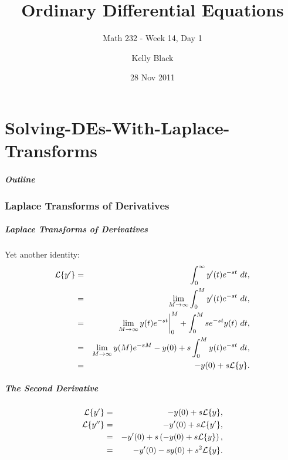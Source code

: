 

\part{Solving-DEs-With-Laplace-Transforms}

\title{Ordinary Differential Equations}
\subtitle{Math 232 - Week 14, Day 1}

\author{Kelly Black}
\date{28 Nov 2011}

\begin{frame}
  \titlepage
\end{frame}

\begin{frame}
  \frametitle{Outline}
\end{frame}


\section{Laplace Transforms of Derivatives}


\begin{frame}
  \frametitle{Laplace Transforms of Derivatives}

  Yet another identity:
  \begin{eqnarray*}
    \laplace{y'} & = & \int^\infty_0 y'(t) e^{-st} ~ dt, \\
    & = & \lim_{M\rightarrow\infty} \int^M_0 y'(t) e^{-st} ~ dt, \\
    & = & \lim_{M\rightarrow\infty} y(t)e^{-st} \bigg|^M_0 + \int^M_0 s e^{-st} y(t)~dt, \\
    & = & \lim_{M\rightarrow\infty} y(M)e^{-sM} - y(0) + s \int^M_0 y(t) e^{-st} ~dt, \\
    & = & -y(0) + s \laplace{y}.
  \end{eqnarray*}

\end{frame}


\begin{frame}
  \frametitle{The Second Derivative}

  \begin{eqnarray*}
    \laplace{y'} & = & -y(0) + s \laplace{y}, \\
    \laplace{y''} & = & -y'(0) + s \laplace{y'}, \\
    & = & -y'(0) + s \lp -y(0) + s \laplace{y} \rp, \\
    & = & -y'(0) - s y(0) + s^2 \laplace{y}.
  \end{eqnarray*}

\end{frame}

